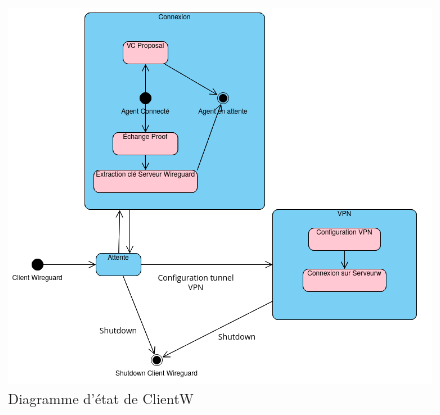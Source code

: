 \documentclass[12pt, openany]{report}
\begin{document}
\begin{flushleft}
\begin{figure}[H]
\includegraphics[scale=0.5]{EtatClientW.png}
\centering
\caption{Diagramme d'état de ClientW}
\end{figure}

\end{flushleft}
\end{document}
